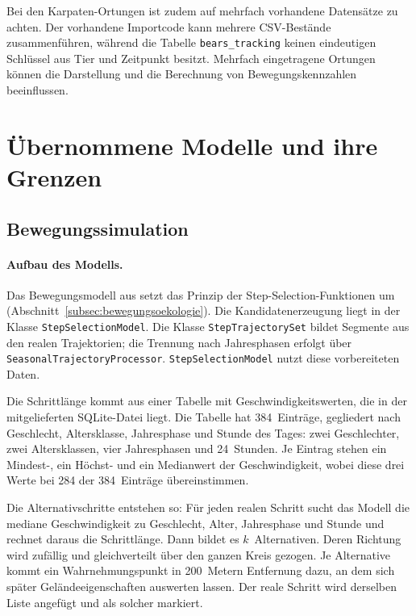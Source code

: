 \documentclass[12pt,a4paper]{report}
\begin{document}
Bei den Karpaten-Ortungen ist zudem auf mehrfach vorhandene Datensätze zu achten.
Der vorhandene Importcode kann mehrere CSV-Bestände zusammenführen, während die Tabelle
\texttt{bears\_tracking} keinen eindeutigen Schlüssel aus Tier und Zeitpunkt besitzt.
Mehrfach eingetragene Ortungen können die Darstellung und die Berechnung von
Bewegungskennzahlen beeinflussen.

\section{Übernommene Modelle und ihre Grenzen}
\label{sec:uebernommene-modelle}

\subsection{Bewegungssimulation}
\label{subsec:simulationsmodell}

\paragraph{Aufbau des Modells.}

Das Bewegungsmodell aus \cite{BreuBA} setzt das Prinzip der Step-Selection-Funktionen um
(Abschnitt~\ref{subsec:bewegungsoekologie}). Die Kandidatenerzeugung liegt in der Klasse
\texttt{StepSelectionModel}. Die Klasse \texttt{StepTrajectorySet} bildet Segmente aus den realen Trajektorien;
die Trennung nach Jahresphasen erfolgt über \texttt{SeasonalTrajectoryProcessor}.
\texttt{StepSelectionModel} nutzt diese vorbereiteten Daten.

Die Schrittlänge kommt aus einer Tabelle mit Geschwindigkeitswerten, die in der
mitgelieferten SQLite-Datei liegt. Die Tabelle hat 384~Einträge, gegliedert nach Geschlecht,
Altersklasse, Jahresphase und Stunde des Tages: zwei Geschlechter, zwei Altersklassen, vier
Jahresphasen und 24~Stunden. Je Eintrag stehen ein Mindest-, ein Höchst- und ein Medianwert
der Geschwindigkeit, wobei diese drei Werte bei 284 der 384~Einträge übereinstimmen.

Die Alternativschritte entstehen so: Für jeden realen Schritt sucht das Modell die mediane
Geschwindigkeit zu Geschlecht, Alter, Jahresphase und Stunde und rechnet daraus die
Schrittlänge. Dann bildet es $k$~Alternativen. Deren Richtung wird zufällig und
gleichverteilt über den ganzen Kreis gezogen. Je Alternative kommt ein Wahrnehmungspunkt in
200~Metern Entfernung dazu, an dem sich später Geländeeigenschaften auswerten lassen. Der
reale Schritt wird derselben Liste angefügt und als solcher markiert.
\end{document}
